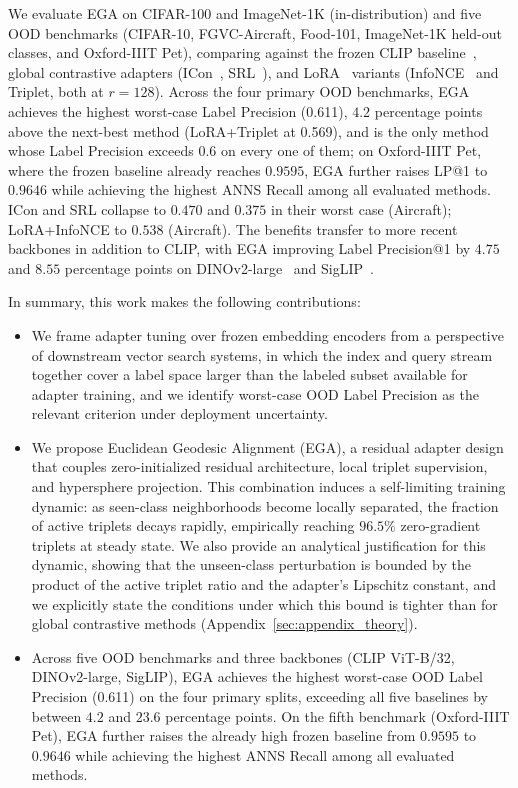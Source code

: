 \documentclass{article}
\begin{document}
We evaluate EGA on CIFAR-100 and ImageNet-1K (in-distribution) and five OOD benchmarks (CIFAR-10, FGVC-Aircraft, Food-101, ImageNet-1K held-out classes, and Oxford-IIIT Pet), comparing against the frozen CLIP baseline~\cite{clip_icml21}, global contrastive adapters (ICon~\cite{alshammariunifying}, SRL~\cite{dong2025improve}), and LoRA~\cite{hu2022lora} variants (InfoNCE~\cite{oord2018representation} and Triplet, both at $r=128$).
Across the four primary OOD benchmarks, EGA achieves the highest worst-case Label Precision (0.611), $4.2$ percentage points above the next-best method (LoRA+Triplet at 0.569), and is the only method whose Label Precision exceeds $0.6$ on every one of them; 
on Oxford-IIIT Pet, where the frozen baseline already reaches $0.9595$, EGA further raises LP@1 to $0.9646$ while achieving the highest ANNS Recall among all evaluated methods.
ICon and SRL collapse to $0.470$ and $0.375$ in their worst case (Aircraft); LoRA+InfoNCE to $0.538$ (Aircraft).
The benefits transfer to more recent backbones in addition to CLIP, with EGA improving Label Precision@1 by $4.75$ and $8.55$ percentage points on DINOv2-large~\cite{oquab2024dinov} and SigLIP~\cite{10377550}.

In summary, this work makes the following contributions:
\begin{itemize}
	\item We frame adapter tuning over frozen embedding encoders
	      from a perspective of downstream vector search systems, in which the index and
	      query stream together cover a label space larger than the labeled
	      subset available for adapter training, and we identify worst-case OOD
	      Label Precision as the relevant criterion under deployment uncertainty.

	\item We propose Euclidean Geodesic Alignment (EGA), a residual adapter design
	      that couples zero-initialized residual architecture, local triplet supervision,
	      and hypersphere projection.
	      This combination induces a self-limiting training dynamic: as seen-class neighborhoods become locally separated, the fraction of active triplets decays rapidly, empirically reaching $96.5\%$ zero-gradient triplets at steady state.
	      We also provide an analytical justification for this dynamic, showing that the unseen-class perturbation is bounded by the product of the active triplet ratio and the adapter's Lipschitz constant, and we explicitly state the conditions under which this bound is tighter than for global contrastive methods (Appendix~\ref{sec:appendix_theory}).

	\item Across five OOD benchmarks and three backbones (CLIP ViT-B/32, DINOv2-large, SigLIP), 
			EGA achieves the highest worst-case OOD Label Precision (0.611) on the four primary splits,
	      exceeding all five baselines by between $4.2$ and $23.6$ percentage points. On the fifth benchmark (Oxford-IIIT Pet), EGA further raises the already high frozen baseline from $0.9595$ to $0.9646$ while achieving the highest ANNS Recall among all evaluated methods.
\end{itemize}
\end{document}
